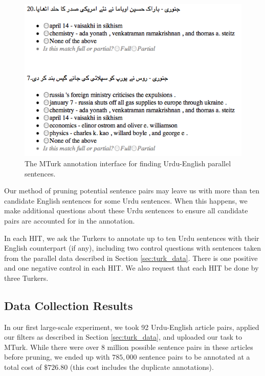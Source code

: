 \begin{figure}[ht]
\begin{center}
\includegraphics[scale=0.5]{images/turk_hit.png}
\caption{The MTurk annotation interface for finding Urdu-English parallel sentences.}
\label{fig:alignment_hit}
\end{center}
\end{figure}

Our method of pruning potential sentence pairs may leave us with more than ten
candidate English sentences for some Urdu sentences. When this happens, we make
additional questions about these Urdu sentences to ensure all candidate pairs
are accounted for in the annotation. 

In each HIT, we ask the Turkers to annotate up to ten Urdu sentences with their
English counterpart (if any), including two control questions with sentences
taken from the parallel data described in Section \ref{sec:turk_data}. There is
one positive and one negative control in each HIT. We also request that each HIT
be done by three Turkers.

\subsection{Data Collection Results}
\label{sec:turk_results}
In our first large-scale experiment, we took 92 Urdu-English article
pairs, applied our filters as described in Section \ref{sec:turk_data}, and
uploaded our task to MTurk. While there were over 8 million possible sentence
pairs in these articles before pruning, we ended up with $785,000$ sentence
pairs to be annotated at a total cost of $\$726.80$ (this cost includes the duplicate
annotations).

